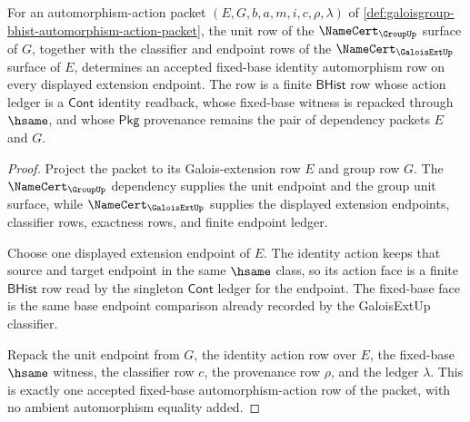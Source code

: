 \begin{theorem}
\label{thm:galoisgroup-identity-automorphism-row}
For an automorphism-action packet $(E,G,b,a,m,i,c,\rho,\lambda)$ of
\autoref{def:galoisgroup-bhist-automorphism-action-packet}, the unit row of
the $\NameCert_{\GroupUp}$ surface of $G$, together with the classifier and
endpoint rows of the $\NameCert_{\GaloisExtUp}$ surface of $E$, determines an
accepted fixed-base identity automorphism row on every displayed extension
endpoint. The row is a finite $\mathsf{BHist}$ row whose action ledger is a
$\mathsf{Cont}$ identity readback, whose fixed-base witness is repacked through
$\hsame$, and whose $\mathsf{Pkg}$ provenance remains the pair of dependency
packets $E$ and $G$.
\end{theorem}
\begin{proof}
Project the packet to its Galois-extension row $E$ and group row $G$. The
$\NameCert_{\GroupUp}$ dependency supplies the unit endpoint and the group unit
surface, while $\NameCert_{\GaloisExtUp}$ supplies the displayed extension
endpoints, classifier rows, exactness rows, and finite endpoint ledger.

Choose one displayed extension endpoint of $E$. The identity action keeps that
source and target endpoint in the same $\hsame$ class, so its action face is a
finite $\mathsf{BHist}$ row read by the singleton $\mathsf{Cont}$ ledger for the
endpoint. The fixed-base face is the same base endpoint comparison already
recorded by the GaloisExtUp classifier.

Repack the unit endpoint from $G$, the identity action row over $E$, the
fixed-base $\hsame$ witness, the classifier row $c$, the provenance row
$\rho$, and the ledger $\lambda$. This is exactly one accepted fixed-base
automorphism-action row of the packet, with no ambient automorphism equality
added.
\end{proof}

